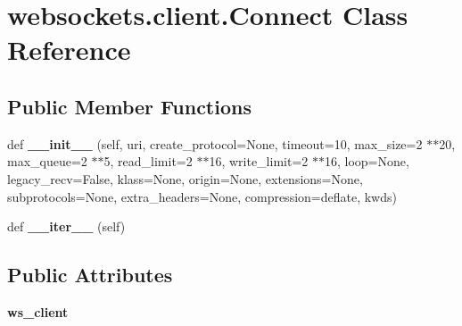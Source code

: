 \hypertarget{classwebsockets_1_1client_1_1_connect}{}\section{websockets.\+client.\+Connect Class Reference}
\label{classwebsockets_1_1client_1_1_connect}
\subsection*{Public Member Functions}
\begin{DoxyCompactItemize}
\item 
\mbox{\label{classwebsockets_1_1client_1_1_connect_a76300198bef802d95f98f77c6a6580c7}} 
def {\bfseries \+\_\+\+\_\+init\+\_\+\+\_\+} (self, uri, create\+\_\+protocol=None, timeout=10, max\+\_\+size=2 $\ast$$\ast$20, max\+\_\+queue=2 $\ast$$\ast$5, read\+\_\+limit=2 $\ast$$\ast$16, write\+\_\+limit=2 $\ast$$\ast$16, loop=None, legacy\+\_\+recv=False, klass=None, origin=None, extensions=None, subprotocols=None, extra\+\_\+headers=None, compression=\textquotesingle{}deflate\textquotesingle{}, kwds)
\item 
\mbox{\label{classwebsockets_1_1client_1_1_connect_a6d057a7ab4ee4aeebdf9161363c30c96}} 
def {\bfseries \+\_\+\+\_\+iter\+\_\+\+\_\+} (self)
\end{DoxyCompactItemize}
\subsection*{Public Attributes}
\begin{DoxyCompactItemize}
\item 
\mbox{\label{classwebsockets_1_1client_1_1_connect_a0fde59935f5c67bb4e658318eb58c08d}} 
{\bfseries ws\+\_\+client}
\end{DoxyCompactItemize}


